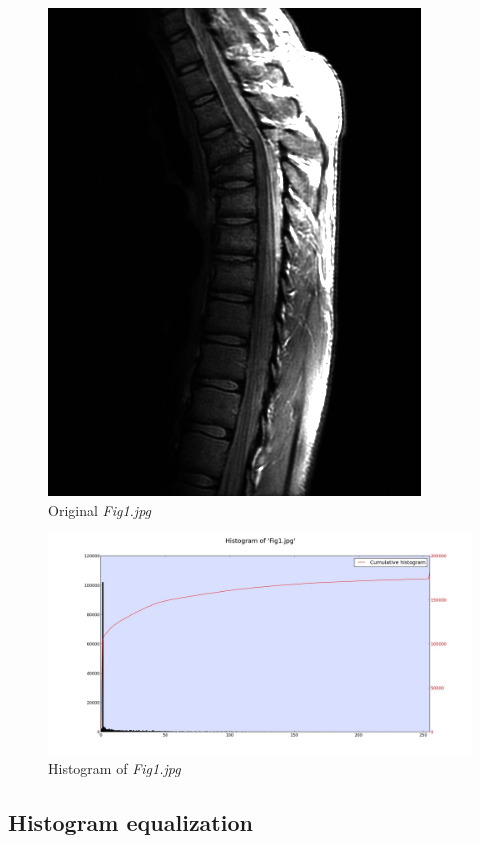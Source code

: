     \begin{figure}[h]
        \centering
        \includegraphics[width=0.7\linewidth]{./images/Fig1.jpg}
        \caption{Original \textit{Fig1.jpg}}
        \label{diagram:fig1}
    \end{figure}

    \begin{figure}[h]
        \centering
        \includegraphics[width=\linewidth]{./images/Histogram_Fig1.jpg}
        \caption{Histogram of \textit{Fig1.jpg}}
        \label{diagram:hist_fig1}
    \end{figure}

    \subsection{Histogram equalization}

